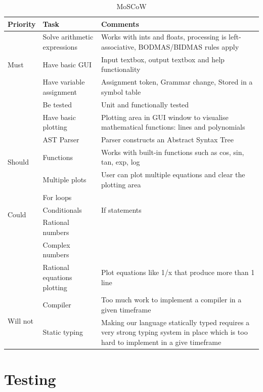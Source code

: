 \documentclass[a4paper, oneside, 11pt]{report}
\begin{document}
\begin{table}[h]
\caption{MoSCoW}
\begin{center}
\begin{tabular}{|p{1in}|p{2in}|p{2.5in}|} \hline
Priority & Task & Comments \\ \hline \hline
\multirow{3}{1in}{Must}
& Solve arithmetic expressions & Works with ints and floats, processing is left-associative, BODMAS/BIDMAS rules apply \\ \cline{2-3}
& Have basic GUI & Input textbox, output textbox and help functionality \\ \cline{2-3}
& Have variable assignment & Assignment token, Grammar change, Stored in a symbol table \\ \cline{2-3}
& Be tested & Unit and functionally tested \\ \cline{2-3}
& Have basic plotting & Plotting area in GUI window to visualise mathematical functions: lines and polynomials \\ \hline \hline
\multirow{3}{1in}{Should}
& AST Parser & Parser constructs an Abstract Syntax Tree \\ \cline{2-3}
& Functions & Works with built-in functions such as cos, sin, tan, exp, log  \\ \cline{2-3}
& Multiple plots & User can plot multiple equations and clear the plotting area \\ \hline \hline
\multirow{3}{1in}{Could}
& For loops & \\ \cline{2-3}
& Conditionals & If statements \\ \cline{2-3}
& Rational numbers & \\ \cline{2-3}
& Complex numbers & \\ \cline{2-3}
& Rational equations plotting & Plot equations like 1/x that produce more than 1 line \\ \hline \hline
\multirow{3}{1in}{Will not}
& Compiler & Too much work to implement a compiler in a given timeframe \\ \cline{2-3}
& Static typing & Making our language statically typed requires a very strong typing system in place which is too hard to implement in a give timeframe \\ \hline
\end{tabular}
\label{Table1}
\end{center}
\end{table}

\chapter{Testing}
\label{app:test}
\end{document}

